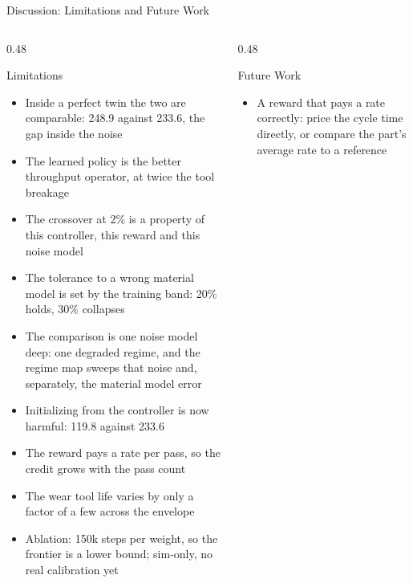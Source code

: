 \documentclass[11pt,aspectratio=169]{beamer}
\begin{document}
\begin{frame}{Discussion: Limitations and Future Work}
    \scriptsize
    \setlength{\itemsep}{-1pt}
    \begin{columns}[T]
        \begin{column}{0.48\textwidth}
            \begin{alertblock}{Limitations}
            \begin{itemize}
            \setlength{\itemsep}{-1pt}
            \setlength{\topsep}{-2pt}
            \setlength{\parsep}{0pt}
                \item Inside a perfect twin the two are comparable: 248.9 against 233.6, the gap inside the noise
                \item The learned policy is the better throughput operator, at twice the tool breakage
                \item The crossover at 2\% is a property of this controller, this reward and this noise model
                \item The tolerance to a wrong material model is set by the training band: 20\% holds, 30\% collapses
                \item \alert{The comparison is one noise model deep}: one degraded regime, and the regime map sweeps that noise and, separately, the material model error
                \item Initializing from the controller is now \alert{harmful}: 119.8 against 233.6
                \item The reward pays a rate per pass, so the credit grows with the pass count
                \item The wear tool life varies by only a factor of a few across the envelope
                \item Ablation: 150k steps per weight, so the frontier is a lower bound; sim-only, no real calibration yet
            \end{itemize}
            \end{alertblock}
        \end{column}
        \begin{column}{0.48\textwidth}
            \begin{exampleblock}{Future Work}
            \begin{itemize}
            \setlength{\itemsep}{-1pt}
            \setlength{\topsep}{-2pt}
            \setlength{\parsep}{0pt}
                \item \alert{A reward that pays a rate correctly}: price the cycle time directly, or compare the part's average rate to a reference

\end{itemize}
\end{exampleblock}
\end{column}
\end{columns}
\end{frame}
\end{document}

